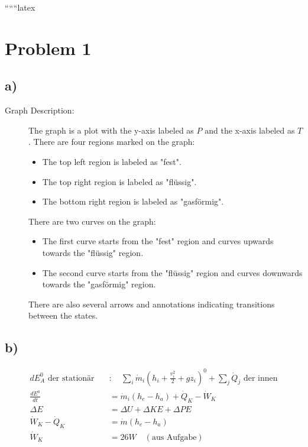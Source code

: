 
``````latex


\section*{Problem 1}

\subsection*{a)}

\begin{description}
    \item[Graph Description:] The graph is a plot with the y-axis labeled as \( P \) and the x-axis labeled as \( T \). There are four regions marked on the graph:
    \begin{itemize}
        \item The top left region is labeled as "fest".
        \item The top right region is labeled as "flüssig".
        \item The bottom right region is labeled as "gasförmig".
    \end{itemize}
    There are two curves on the graph:
    \begin{itemize}
        \item The first curve starts from the "fest" region and curves upwards towards the "flüssig" region.
        \item The second curve starts from the "flüssig" region and curves downwards towards the "gasförmig" region.
    \end{itemize}
    There are also several arrows and annotations indicating transitions between the states.
\end{description}

\subsection*{b)}

\begin{align*}
    dE_{A}^0 \text{ der stationär} \quad & : \quad \sum_i \dot{m}_i \left( h_i + \frac{v_i^2}{2} + g z_i \right)^0 + \sum_j \dot{Q}_j \text{ der innen} \\
    \frac{dE^0}{dt} & = \dot{m}_i (h_e - h_a) + \dot{Q}_K - \dot{W}_K \\
    \Delta E & = \Delta U + \Delta KE + \Delta PE \\
    \dot{W}_K - \dot{Q}_K & = \dot{m} (h_e - h_a) \\
    \dot{W}_K & = 26 W \quad (\text{aus Aufgabe})
\end{align*}

